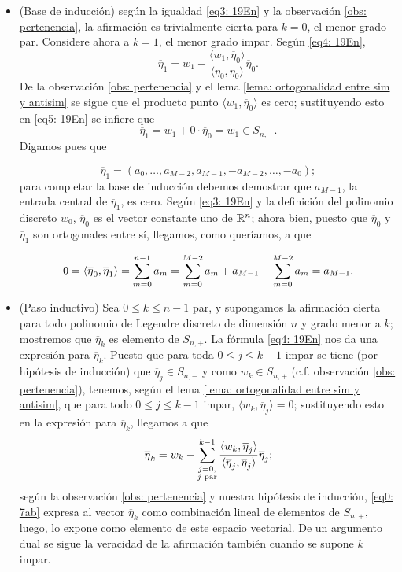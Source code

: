\begin{itemize}

\item (Base de inducción) según la igualdad
\eqref{eq3: 19En} y la observación 
\ref{obs: pertenencia}, la afirmación 
es trivialmente cierta para $k=0$, el menor grado par.
Considere ahora a $k=1$, el menor grado impar. Según 
\eqref{eq4: 19En}, 
\begin{equation}
\label{eq5: 19En}
\overline{\eta}_{1}= w_{1}
- \frac{\langle w_{1}, \overline{\eta}_{0} \rangle}
{\langle \overline{\eta}_{0}, \overline{\eta}_{0} \rangle}\overline{\eta}_{0}.
\end{equation}
De la observación 
\ref{obs: pertenencia} y el lema
\ref{lema: ortogonalidad entre sim y antisim} se sigue
que el producto punto $\langle w_{1}, \overline{\eta}_{0} \rangle$
es cero; sustituyendo esto en \eqref{eq5: 19En}
se infiere que 
\[
\overline{\eta}_{1} = w_{1} + 0 \cdot \overline{\eta}_{0}=
w_{1} \in S_{n,-}.
\]
Digamos pues que

\[
\overline{\eta}_{1} = 
(a_{0}, \ldots , a_{M-2}, a_{M-1}, -a_{M-2}, \ldots , -a_{0} );
\]
para completar la base de inducción debemos demostrar
que $a_{M-1}$, la entrada central de $\overline{\eta}_{1}$,
es cero. Según \eqref{eq3: 19En} y
la definición del polinomio discreto $w_{0}$, 
$\overline{\eta}_{0}$ es el vector constante uno de $\mathbb{R}^{n}$;
ahora bien, puesto que $\overline{\eta}_{0}$
y $\overline{\eta}_{1}$
son ortogonales entre sí, llegamos, como queríamos, a que

\[
0 = \langle \overline{\eta}_{0}, \overline{\eta}_{1}\rangle
= \sum\limits_{m=0}^{n-1}a_{m} = 
\sum\limits_{m=0}^{M-2}a_{m} + a_{M-1} -
\sum\limits_{m=0}^{M-2}a_{m} = a_{M-1}.
\]



\item (Paso inductivo) Sea $0 \leq k \leq n-1$ par, y
supongamos la afirmación cierta para todo polinomio de Legendre
discreto de dimensión $n$ y grado menor a $k$;
mostremos que $\overline{\eta}_{k}$ es elemento de $S_{n,+}$.
La fórmula \eqref{eq4: 19En} nos da una expresión
para $\overline{\eta}_{k}$.
Puesto que
para toda $0 \leq j \leq k-1$ impar se tiene 
(por hipótesis de inducción) 
que $\overline{\eta}_{j} \in S_{n,-}$
y como $w_{k} \in S_{n,+}$ (c.f. observación 
\ref{obs: pertenencia}), tenemos, según el lema
\ref{lema: ortogonalidad entre sim y antisim}, que
para todo $0 \leq j \leq k-1$ impar, 
$\langle w_{k}, \overline{\eta}_{j} \rangle=0$;
sustituyendo esto en la expresión para 
$\overline{\eta}_{k}$, llegamos a que
\begin{equation}
\label{eq0: 7ab}
\overline{\eta}_{k}= w_{k}-
\sum\limits_{
\substack{ {j=0}, \\  {j\text{ par}}}
}^{k-1}
\frac{\langle w_{k}, \overline{\eta}_{j} \rangle}
{\langle \overline{\eta}_{j}, \overline{\eta}_{j} \rangle}\overline{\eta}_{j}
;
\end{equation}
según la observación \ref{obs: pertenencia}
y nuestra hipótesis de inducción, 
\eqref{eq0: 7ab} expresa al vector 
$\overline{\eta}_{k}$ como combinación lineal
de elementos de $S_{n,+}$, luego, lo expone como
elemento de este espacio vectorial. De un argumento
dual se sigue la veracidad de la afirmación también
cuando se supone $k$ impar.
\end{itemize}

